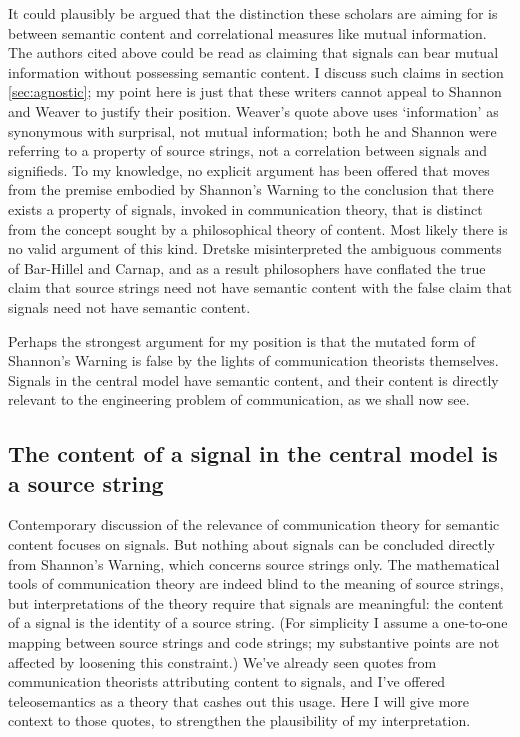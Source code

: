 \documentclass[12pt]{article}
\begin{document}
It could plausibly be argued that the distinction these scholars are aiming for is between semantic content and correlational measures like mutual information.
The authors cited above could be read as claiming that signals can bear mutual information without possessing semantic content.
I discuss such claims in section \ref{sec:agnostic}; my point here is just that these writers cannot appeal to Shannon and Weaver to justify their position.
Weaver's quote above uses `information' as synonymous with surprisal, not mutual information; both he and Shannon were referring to a property of source strings, not a correlation between signals and signifieds.
To my knowledge, no explicit argument has been offered that moves from the premise embodied by {\sc Shannon's Warning} to the conclusion that there exists a property of signals, invoked in communication theory, that is distinct from the concept sought by a philosophical theory of content.
Most likely there is no valid argument of this kind.
Dretske misinterpreted the ambiguous comments of Bar-Hillel and Carnap, and as a result philosophers have conflated the true claim that source strings need not have semantic content with the false claim that signals need not have semantic content.

Perhaps the strongest argument for my position is that the mutated form of {\sc Shannon's Warning} is false by the lights of communication theorists themselves.
Signals in the central model have semantic content, and their content is directly relevant to the engineering problem of communication, as we shall now see.


\subsection{The content of a signal in the central model is a source string}\label{subsec:signalContent}

Contemporary discussion of the relevance of communication theory for semantic content focuses on signals.
But nothing about signals can be concluded directly from {\sc Shannon's Warning}, which concerns source strings only.
The mathematical tools of communication theory are indeed blind to the meaning of source strings, but interpretations of the theory require that signals are meaningful: the content of a signal is the identity of a source string.
(For simplicity I assume a one-to-one mapping between source strings and code strings; my substantive points are not affected by loosening this constraint.)
We've already seen quotes from communication theorists attributing content to signals, and I've offered teleosemantics as a theory that cashes out this usage.
Here I will give more context to those quotes, to strengthen the plausibility of my interpretation.
\end{document}
